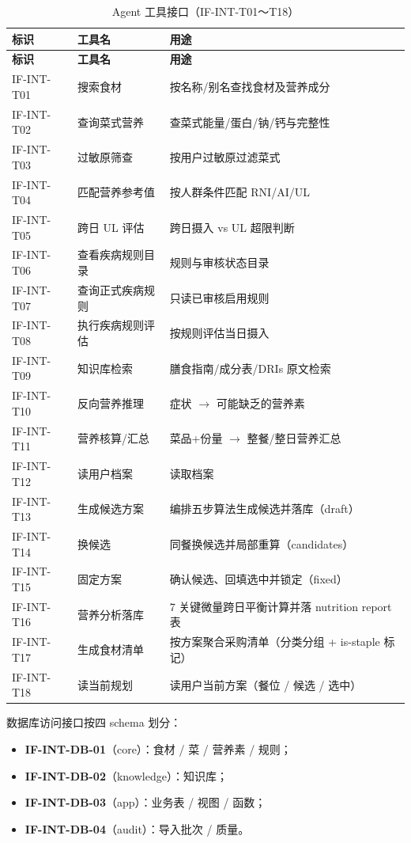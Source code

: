 \documentclass[12pt,a4paper]{ctexart}
\begin{document}
\begin{xltabular}{\linewidth}{p{2.5cm}p{4cm}L}
\caption{Agent 工具接口（IF-INT-T01～T18）\label{tab:tools}} \\
\toprule
\textbf{标识} & \textbf{工具名} & \textbf{用途} \\
\midrule
\endfirsthead
\toprule
\textbf{标识} & \textbf{工具名} & \textbf{用途} \\
\midrule
\endhead
IF-INT-T01 & 搜索食材 & 按名称/别名查找食材及营养成分 \\
IF-INT-T02 & 查询菜式营养 & 查菜式能量/蛋白/钠/钙与完整性 \\
IF-INT-T03 & 过敏原筛查 & 按用户过敏原过滤菜式 \\
IF-INT-T04 & 匹配营养参考值 & 按人群条件匹配 RNI/AI/UL \\
IF-INT-T05 & 跨日 UL 评估 & 跨日摄入 vs UL 超限判断 \\
IF-INT-T06 & 查看疾病规则目录 & 规则与审核状态目录 \\
IF-INT-T07 & 查询正式疾病规则 & 只读已审核启用规则 \\
IF-INT-T08 & 执行疾病规则评估 & 按规则评估当日摄入 \\
IF-INT-T09 & 知识库检索 & 膳食指南/成分表/DRIs 原文检索 \\
IF-INT-T10 & 反向营养推理 & 症状 $\rightarrow$ 可能缺乏的营养素 \\
IF-INT-T11 & 营养核算/汇总 & 菜品+份量 $\rightarrow$ 整餐/整日营养汇总 \\
IF-INT-T12 & 读用户档案 & 读取档案 \\
IF-INT-T13 & 生成候选方案 & 编排五步算法生成候选并落库（draft） \\
IF-INT-T14 & 换候选 & 同餐换候选并局部重算（candidates） \\
IF-INT-T15 & 固定方案 & 确认候选、回填选中并锁定（fixed） \\
IF-INT-T16 & 营养分析落库 & 7 关键微量跨日平衡计算并落 nutrition report 表 \\
IF-INT-T17 & 生成食材清单 & 按方案聚合采购清单（分类分组 + is-staple 标记） \\
IF-INT-T18 & 读当前规划 & 读用户当前方案（餐位 / 候选 / 选中） \\
\bottomrule
\end{xltabular}

\noindent 数据库访问接口按四 schema 划分：

\begin{itemize}[leftmargin=1em]
  \item \textbf{IF-INT-DB-01}（core）：食材 / 菜 / 营养素 / 规则；
  \item \textbf{IF-INT-DB-02}（knowledge）：知识库；
  \item \textbf{IF-INT-DB-03}（app）：业务表 / 视图 / 函数；
  \item \textbf{IF-INT-DB-04}（audit）：导入批次 / 质量。
\end{itemize}
\end{document}
